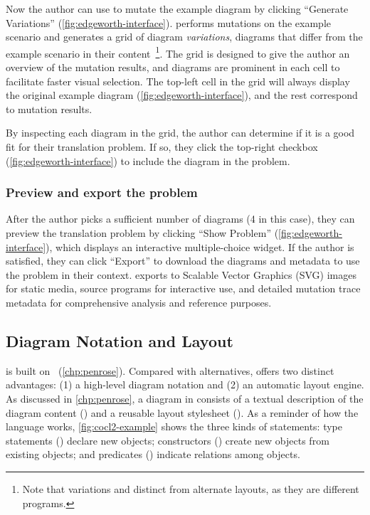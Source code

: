 Now the author can use \Edgeworth to mutate the example diagram by clicking ``Generate Variations'' (\cref{fig:edgeworth-interface}). \Edgeworth performs mutations on the example scenario and generates a grid of diagram \textit{variations}, \ie diagrams that differ from the example scenario in their content~\footnote{Note that variations and distinct from alternate layouts, as they are different \Substance programs.}. The grid is designed to give the author an overview of the mutation results, and diagrams are prominent in each cell to facilitate faster visual selection. The top-left cell in the grid will always display the original example diagram (\cref{fig:edgeworth-interface}), and the rest correspond to mutation results.

By inspecting each diagram in the grid, the author can determine if it is a good fit for their translation problem. If so, they click the top-right checkbox (\cref{fig:edgeworth-interface}) to include the diagram in the problem.

\subsubsection{Preview and export the problem}
After the author picks a sufficient number of diagrams (4 in this case), they can preview the translation problem by clicking ``Show Problem'' (\cref{fig:edgeworth-interface}), which displays an interactive multiple-choice widget. If the author is satisfied, they can click ``Export'' to download the diagrams and metadata to use the problem in their context. \Edgeworth exports to Scalable Vector Graphics (SVG) images for static media, source programs for interactive use, and detailed mutation trace metadata for comprehensive analysis and reference purposes.

\subsection{Diagram Notation and Layout}
\label{sec:edgeworth-layout}

\Edgeworth is built on \Penrose~(\cref{chp:penrose}). Compared with alternatives, \Penrose offers two distinct advantages: (1) a high-level diagram notation and (2) an automatic layout engine. As discussed in \cref{chp:penrose}, a diagram in \Penrose consists of a textual description of the diagram content (\Substance) and a reusable layout stylesheet (\Style). As a reminder of how the \Substance language works, \cref{fig:cocl2-example} shows the three kinds of \Substance statements: type statements (\eg {}) declare new objects; constructors () create new objects from existing objects; and predicates () indicate relations among objects. 

